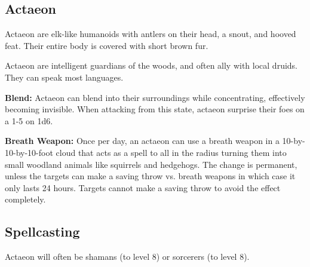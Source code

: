 \begin{multicols*}{2}
\subsection{Actaeon}

Actaeon are elk-like humanoids with antlers on their head, a snout, and hooved feat. Their entire body is covered with short brown fur.

Actaeon are intelligent guardians of the woods, and often ally with local druids. They can speak most languages.

\textbf{Blend:} Actaeon can blend into their surroundings while concentrating, effectively becoming invisible. When attacking from this state, actaeon surprise their foes on a 1-5 on 1d6.

\textbf{Breath Weapon:} Once per day, an actaeon can use a breath weapon in a 10-by-10-by-10-foot cloud that acts as a  spell to all in the radius turning them into small woodland animals like squirrels and hedgehogs. The change is permanent, unless the targets can make a saving throw vs. breath weapons in which case it only lasts 24 hours. Targets cannot make a saving throw to avoid the effect completely.

\subsection{Spellcasting}
Actaeon will often be shamans (to level 8) or sorcerers (to level 8).


\end{multicols*}
